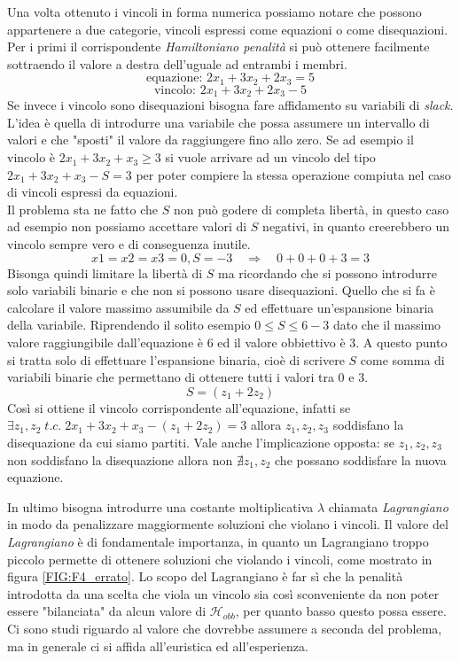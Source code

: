 \documentclass[a4paper]{article}
\begin{document}
Una volta ottenuto i vincoli in forma numerica possiamo notare che possono appartenere a due categorie, vincoli espressi come equazioni o come disequazioni.\\
Per i primi il corrispondente \textit{Hamiltoniano penalità} si può ottenere facilmente sottraendo il valore a destra dell'uguale ad entrambi i membri.
$$\text{equazione: } 2x_1 + 3x_2 + 2x_3 = 5 $$
$$\text{vincolo: } 2x_1 + 3x_2 + 2x_3 -5 $$
Se invece i vincolo sono disequazioni bisogna fare affidamento su variabili di \textit{slack}.\\
L'idea è quella di introdurre una variabile che possa assumere un intervallo di valori e che "sposti" il valore da raggiungere fino allo zero.
Se ad esempio il vincolo è $2x_1 + 3x_2 + x_3 \geq 3 $ si vuole arrivare ad un vincolo del tipo $2x_1 + 3x_2 + x_3 - S =3 $ per poter compiere la stessa operazione compiuta nel caso di vincoli espressi da equazioni.\\
Il problema sta ne fatto che $S$ non può godere di completa libertà, in questo caso ad esempio non possiamo accettare valori di $S$ negativi, in quanto creerebbero un vincolo sempre vero e di conseguenza inutile.
$$ x1=x2=x3=0, S= -3 \quad \Rightarrow \quad 0 + 0 + 0 + 3 = 3 $$
Bisonga quindi limitare la libertà di $S$ ma ricordando che si possono introdurre solo variabili binarie e che non si possono usare disequazioni.
Quello che si fa è calcolare il valore massimo assumibile da $S$ ed effettuare un'espansione binaria della variabile.
Riprendendo il solito esempio $0 \leq S \leq 6-3$ dato che il massimo valore raggiungibile dall'equazione è 6 ed il valore obbiettivo è 3.
A questo punto si tratta solo di effettuare l'espansione binaria, cioè di scrivere $S$ come somma di variabili binarie che permettano di ottenere tutti i valori tra 0 e 3.
$$ S = (z_1 + 2z_2) $$
Così si ottiene il vincolo corrispondente all'equazione, infatti se $\exists z_1,z_2 \; t.c. \; 2x_1 + 3x_2 + x_3 - (z_1 + 2z_2)=3 $ allora $z_1,z_2,z_3$ soddisfano la disequazione da cui siamo partiti.
Vale anche l'implicazione opposta: se $z_1,z_2,z_3$ non soddisfano la disequazione allora non $\nexists z_1,z_2$ che possano soddisfare la nuova equazione.

In ultimo bisogna introdurre una costante moltiplicativa $\lambda$ chiamata \textit{Lagrangiano} in modo da penalizzare maggiormente soluzioni che violano i vincoli.
Il valore del \textit{Lagrangiano} è di fondamentale importanza, in quanto un Lagrangiano troppo piccolo permette di ottenere soluzioni che violando i vincoli, come mostrato in figura \ref{FIG:F4_errato}. %
Lo scopo del Lagrangiano è far sì che la penalità introdotta da una scelta che viola un vincolo sia così sconveniente da non poter essere "bilanciata" da alcun valore di $\mathcal{H}_{obb}$, per quanto basso questo possa essere.
Ci sono studi riguardo al valore che dovrebbe assumere a seconda del problema, ma in generale ci si affida all'euristica ed all'esperienza.
\newpage
\end{document}
